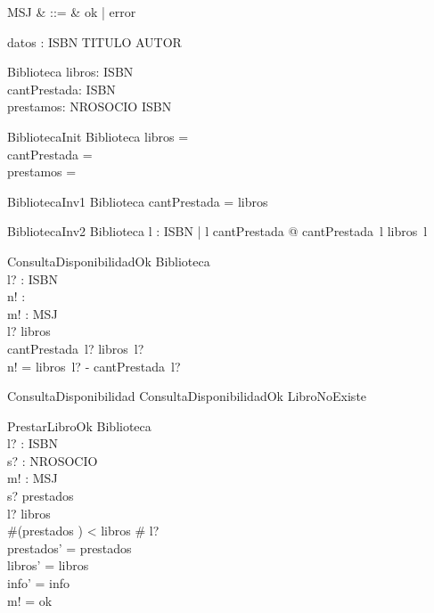 \begin{zed}
\end{zed}

\begin{syntax}
MSJ & ::= & ok | error
\end{syntax}

\begin{axdef}
datos : ISBN \pfun TITULO \cross AUTOR
\end{axdef}

\begin{schema}{Biblioteca}
libros: ISBN \pfun \nat \\
cantPrestada: ISBN \pfun \nat \\
prestamos: NROSOCIO \pfun ISBN
\end{schema}

\begin{schema}{BibliotecaInit}
Biblioteca
\where
libros = \emptyset \\
cantPrestada = \emptyset \\
prestamos = \emptyset
\end{schema}

\begin{schema}{BibliotecaInv1}
Biblioteca
\where
\dom cantPrestada = \dom libros
\end{schema}

\begin{schema}{BibliotecaInv2}
Biblioteca
\where
\forall l : ISBN | l \in \dom cantPrestada @ cantPrestada~l \leq libros~l
\end{schema}

\begin{schema}{ConsultaDisponibilidadOk}
\Xi Biblioteca \\
l? : ISBN \\ 
n! : \nat \\
m! : MSJ \\
\where 
l? \in \dom libros \\
cantPrestada~l? \leq libros~l? \\
n! = libros~l? - cantPrestada~l? \\
\end{schema}

\begin{zed}
ConsultaDisponibilidad  ConsultaDisponibilidadOk \lor LibroNoExiste
\end{zed}

\begin{schema}{PrestarLibroOk}
\Delta Biblioteca \\
l? : ISBN \\ 
s? : NROSOCIO \\
m! : MSJ \\
\where
s? \notin \dom prestados \\
l? \in \dom libros \\
\#(prestados \rres {}) < libros \# l? \\
prestados' = prestados \oplus {} \\
libros' = libros \\
info' = info \\
m! = ok \\
\end{schema}

